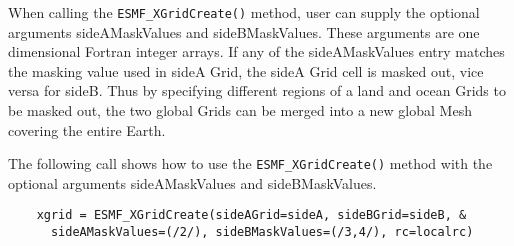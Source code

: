    When calling the {\tt ESMF\_XGridCreate()} method, user can supply the optional arguments
   sideAMaskValues and sideBMaskValues.
   These arguments are one dimensional Fortran integer arrays. If any of the sideAMaskValues entry
   matches the masking value used in sideA Grid, the sideA Grid cell is masked out, vice versa for sideB.
   Thus by specifying different regions of a land and ocean Grids to be masked out, the two global Grids
   can be merged into a new global Mesh covering the entire Earth.
  
   The following call shows how to use the {\tt ESMF\_XGridCreate()} method with the optional
   arguments sideAMaskValues and sideBMaskValues.
   

 \begin{verbatim}
    xgrid = ESMF_XGridCreate(sideAGrid=sideA, sideBGrid=sideB, &
      sideAMaskValues=(/2/), sideBMaskValues=(/3,4/), rc=localrc)
 
\end{verbatim}

\setlength{\parskip}{\oldparskip}
\setlength{\parindent}{\oldparindent}
\setlength{\baselineskip}{\oldbaselineskip}
